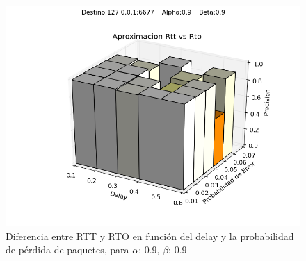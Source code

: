 \begin{figure}[H]
  \centering	
	\includegraphics[scale=0.5]{../analisis/graficos_tablas/graficos_en_funcion_de_delay_probaerror/0.9-0.9/rtt_vs_rto.png}
  \caption{Diferencia entre RTT y RTO en funci\'on del delay y la probabilidad de pérdida de paquetes, para $\alpha$: 0.9, $\beta$: 0.9}
	\label{fig:histo-src-sitiotrabajo}
\end{figure}

